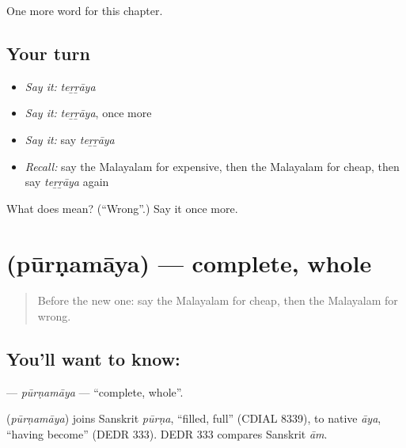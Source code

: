 \begin{grammarlens}[title={What you've built}]
One more word for this chapter.
\end{grammarlens}

\subsection*{Your turn}
\begin{itemize}
\raggedright
  \item \emph{Say it:} \emph{teṟṟāya}
  \item \emph{Say it:} \emph{teṟṟāya}, once more
  \item \emph{Say it:} say \emph{teṟṟāya}
  \item \emph{Recall:} say the Malayalam for expensive, then the Malayalam for cheap, then say \emph{teṟṟāya} again
\end{itemize}

\begin{tcolorbox}[breakable,colback=teal!4,colframe=teal!35!black,title={Before you move on}]
What does  mean? (\textquotedblleft{}Wrong\textquotedblright{}.) Say it once more.
\end{tcolorbox}
\section[\texorpdfstring{\ml{പൂർണ്ണമായ} (pūrṇamāya)}{പൂർണ്ണമായ (pūrṇamāya)}]{ (pūrṇamāya) — complete, whole}

\label{lesson:ML-C170-purnamaya}



\begin{quote}
Before the new one: say the Malayalam for cheap, then the Malayalam for wrong.
\end{quote}

\subsection*{You'll want to know: }
\textbf{} — \emph{pūrṇamāya} — \textquotedblleft{}complete, whole\textquotedblright{}.

\begin{cousinweb}
\textbf{} (\emph{pūrṇamāya}) joins Sanskrit \emph{pūrṇa}, \textquotedblleft{}filled, full\textquotedblright{} (CDIAL 8339), to native \emph{āya}, \textquotedblleft{}having become\textquotedblright{} (DEDR 333). DEDR 333 compares Sanskrit \emph{ām}.
\end{cousinweb}

